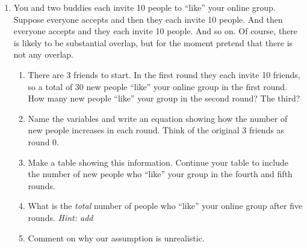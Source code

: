 \begin{enumerate}
\item You and two buddies each invite 10 people to ``like'' your online group.  Suppose everyone accepts and then they each invite 10 people.  And then everyone accepts and they each invite 10 people.  And so on. Of course, there is likely to be substantial overlap, but for the moment pretend that there is not any overlap.  
\begin{enumerate}
\item There are 3 friends to start.  In the first round they each invite 10 friends, so a total of 30 new people ``like'' your online group in the first round.  How many new people ``like'' your group in the second round?  The third? \vfill
\item Name the variables and write an equation showing how the number of new people increases in each round. Think of the original 3 friends as round 0.\vfill \vfill
\item Make a table showing this information. Continue your table to include the number of new people who ``like'' your group in the fourth and fifth rounds. \vfill 
\item What is the \emph{total} number of people who ``like'' your online group after five rounds.  \emph{Hint: add} \vfill
\item Comment on why our assumption is unrealistic. \vfill
\end{enumerate} 

\end{enumerate}


